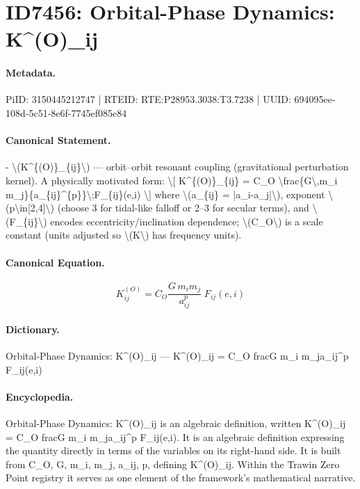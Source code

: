 \section*{ID7456: Orbital-Phase Dynamics: K\textasciicircum{}(O)\_ij}
\paragraph{Metadata.}
PiID: 3150445212747 | RTEID: RTE:P28953.3038:T3.7238 | UUID: 694095ee-108d-5c51-8e6f-7745ef085e84

\paragraph{Canonical Statement.}
- \textbackslash{}(K\textasciicircum{}\{(O)\}\_\{ij\}\textbackslash{}) — orbit–orbit resonant coupling (gravitational perturbation kernel). A physically motivated form: \textbackslash{}[ K\textasciicircum{}\{(O)\}\_\{ij\} = C\_O \textbackslash{}frac\{G\textbackslash{},m\_i m\_j\}\{a\_\{ij\}\textasciicircum{}\{p\}\}\textbackslash{};F\_\{ij\}(e,i) \textbackslash{}] where \textbackslash{}(a\_\{ij\} = |a\_i-a\_j|\textbackslash{}), exponent \textbackslash{}(p\textbackslash{}in[2,4]\textbackslash{}) (choose 3 for tidal-like falloff or 2–3 for secular terms), and \textbackslash{}(F\_\{ij\}\textbackslash{}) encodes eccentricity/inclination dependence; \textbackslash{}(C\_O\textbackslash{}) is a scale constant (units adjusted so \textbackslash{}(K\textbackslash{}) has frequency units).

\paragraph{Canonical Equation.}
\[
K^{(O)}_{ij} = C_O \frac{G\,m_i m_j}{a_{ij}^{p}}\;F_{ij}(e,i)
\]

\paragraph{Dictionary.}
Orbital-Phase Dynamics: K\textasciicircum{}(O)\_ij — K\textasciicircum{}(O)\_ij = C\_O fracG m\_i m\_ja\_ij\textasciicircum{}p F\_ij(e,i)

\paragraph{Encyclopedia.}
Orbital-Phase Dynamics: K\textasciicircum{}(O)\_ij is an algebraic definition, written K\textasciicircum{}(O)\_ij = C\_O fracG m\_i m\_ja\_ij\textasciicircum{}p F\_ij(e,i). It is an algebraic definition expressing the quantity directly in terms of the variables on its right-hand side. It is built from C\_O, G, m\_i, m\_j, a\_ij, p, defining K\textasciicircum{}(O)\_ij. Within the Trawin Zero Point registry it serves as one element of the framework's mathematical narrative.
